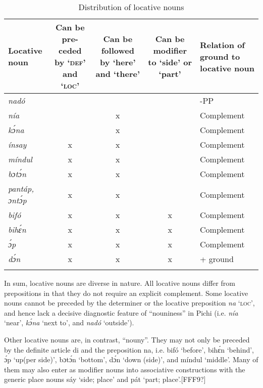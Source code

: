 \begin{table}
\caption{Distribution of locative nouns}
\label{tab:key:8.3}

\begin{tabularx}{\textwidth}{QCCCQ}
\lsptoprule
Locative noun &
  \raggedright Can be pre-ceded by  ‘\textsc{def’} and  ‘\textsc{loc’} & 
  \raggedright Can be followed by  ‘here’ and  ‘there’ & 
  \raggedright Can be modifier to  ‘side’ or  ‘part’ & Relation of ground to locative noun\\
\midrule 
\itshape nadó &  &  &  & -PP\\
\itshape nía &  & x &  & Complement\\
\itshape kɔ́na &  & x &  & Complement\\
\itshape ínsay & x & x &  & Complement\\
\itshape míndul & x & x &  & Complement\\
\itshape bɔtɔ́n & x & x &  & Complement\\
\itshape pantáp, ɔntɔ́p & x & x &  & Complement\\
\itshape bifó & x & x & x & Complement\\
\itshape bihɛ́n & x & x & x & Complement\\
\itshape ɔ́p & x & x & x & Complement\\
\itshape dɔ́n & x & x & x &  + ground\\
\lspbottomrule
\end{tabularx}
\end{table}
In sum, locative nouns are diverse in nature. All locative nouns differ from prepositions in that they do not require an explicit complement. Some locative nouns cannot be preceded by the determiner or the locative preposition \textit{na} ‘\textsc{loc}’, and hence lack a decisive diagnostic feature of “nouniness” in Pichi (i.e. \textit{nía} ‘near’, \textit{kɔ́na} ‘next to’, and \textit{nadó} ‘outside’). 


Other locative nouns are, in contrast, “nouny”. They may not only be preceded by the definite article di and the preposition na, i.e. bifó ‘before’, bihɛ́n ‘behind’, ɔ́p ‘up(per side)’, bɔtɔ́n ‘bottom’, dɔ́n ‘down (side)’, and míndul ‘middle’. Many of them may also enter as modifier nouns into associative constructions with the generic place nouns sáy ‘side; place’ and pát ‘part; place’.[FFF9?] 



